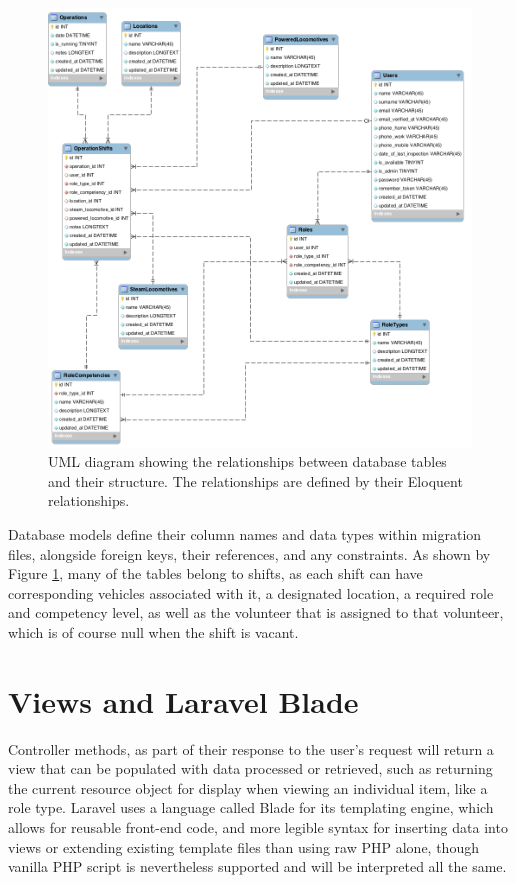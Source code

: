 \begin{figure}[!ht]
    \includegraphics[width=1.0\textwidth]{Figures/Models}
    \caption{UML diagram showing the relationships between database tables and their structure. The relationships are defined by their Eloquent relationships.}
    \label{fig:relationships}
\end{figure}

Database models define their column names and data types within migration files, alongside foreign keys, their references, and any constraints. As shown by Figure \ref{fig:relationships}, many of the tables belong to shifts, as each shift can have corresponding vehicles associated with it, a designated location, a required role and competency level, as well as the volunteer that is assigned to that volunteer, which is of course null when the shift is vacant.

\section{Views and Laravel Blade}

Controller methods, as part of their response to the user's request will return a view that can be populated with data processed or retrieved, such as returning the current resource object for display when viewing an individual item, like a role type. Laravel uses a language called Blade for its templating engine, which allows for reusable front-end code, and more legible syntax for inserting data into views or extending existing template files than using raw PHP alone, though vanilla PHP script is nevertheless supported and will be interpreted all the same. \cite{Laravel9} \cite{Underwood1}


